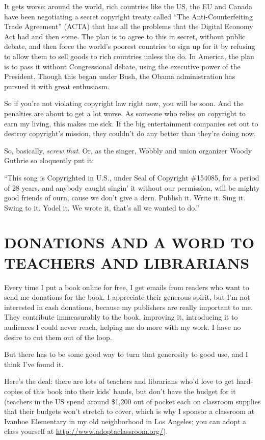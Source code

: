 It gets worse: around the world, rich countries like the US, the EU
and Canada have been negotiating a secret copyright treaty called
``The Anti-Counterfeiting Trade Agreement'' (ACTA) that has all the
problems that the Digital Economy Act had and then some. The plan
is to agree to this in secret, without public debate, and then
force the world's poorest countries to sign up for it by refusing
to allow them to sell goods to rich countries unless the do. In
America, the plan is to pass it without Congressional debate, using
the executive power of the President. Though this began under Bush,
the Obama administration has pursued it with great enthusiasm.

So if you're not violating copyright law right now, you will be
soon. And the penalties are about to get a lot worse. As someone
who relies on copyright to earn my living, this makes me sick. If
the big entertainment companies set out to destroy copyright's
mission, they couldn't do any better than they're doing now.

So, basically, \emph{screw that}. Or, as the singer, Wobbly and
union organizer Woody Guthrie so eloquently put it:

``This song is Copyrighted in U.S., under Seal of Copyright
\#154085, for a period of 28 years, and anybody caught singin' it
without our permission, will be mighty good friends of ourn, cause
we don't give a dern. Publish it. Write it. Sing it. Swing to it.
Yodel it. We wrote it, that's all we wanted to do.''

\section{DONATIONS AND A WORD TO TEACHERS AND LIBRARIANS}

Every time I put a book online for free, I get emails from readers
who want to send me donations for the book. I appreciate their
generous spirit, but I'm not interested in cash donations, because
my publishers are really important to me. They contribute
immeasurably to the book, improving it, introducing it to audiences
I could never reach, helping me do more with my work. I have no
desire to cut them out of the loop.

But there has to be some good way to turn that generosity to good
use, and I think I've found it.

Here's the deal: there are lots of teachers and librarians who'd
love to get hard-copies of this book into their kids' hands, but
don't have the budget for it (teachers in the US spend around
\$1,200 out of pocket each on classroom supplies that their budgets
won't stretch to cover, which is why I sponsor a classroom at
Ivanhoe Elementary in my old neighborhood in Los Angeles; you can
adopt a class yourself
at \url{http://www.adoptaclassroom.org/}).

